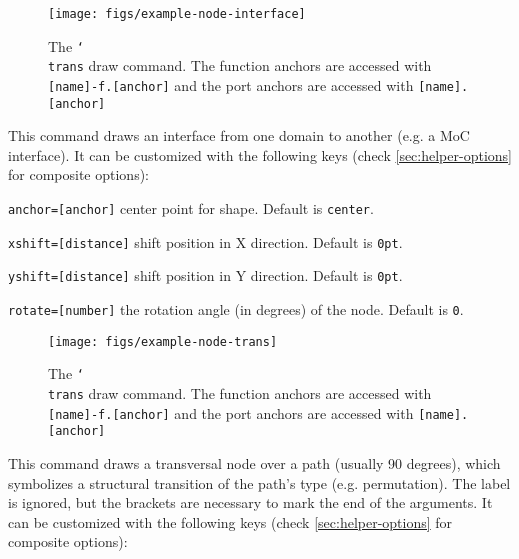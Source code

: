 \begin{figure}[htb]\centering
\texttt{[image: figs/example-node-interface]}

\caption{The \texttt{\char`\\trans} draw command. The function anchors are accessed with \texttt{[name]-f.[anchor]} and the port anchors are accessed with \texttt{[name].[anchor]}}
\end{figure}
\hspace{1pt}

\noindent This command draws an interface from one domain to another (e.g. a MoC interface). It can be customized with the following keys (check \ref{sec:helper-options} for composite options):

\begin{optionslist}
\item \texttt{anchor=[anchor]} center point for shape. Default is \texttt{center}.
\item \texttt{xshift=[distance]} shift position in X direction. Default is \texttt{0pt}.
\item \texttt{yshift=[distance]} shift position in Y direction. Default is \texttt{0pt}.
\item \texttt{rotate=[number]} the rotation angle (in degrees) of the node. Default is \texttt{0}.
\end{optionslist}


\begin{figure}[htb]\centering
\texttt{[image: figs/example-node-trans]}

\caption{The \texttt{\char`\\trans} draw command. The function anchors are accessed with \texttt{[name]-f.[anchor]} and the port anchors are accessed with \texttt{[name].[anchor]}}
\end{figure}
\hspace{1pt}

\noindent This command draws a transversal node over a path (usually 90 degrees), which symbolizes a structural transition of the path's type (e.g. permutation). The label is ignored, but the brackets are necessary to mark the end of the arguments. It can be customized with the following keys (check \ref{sec:helper-options} for composite options):


